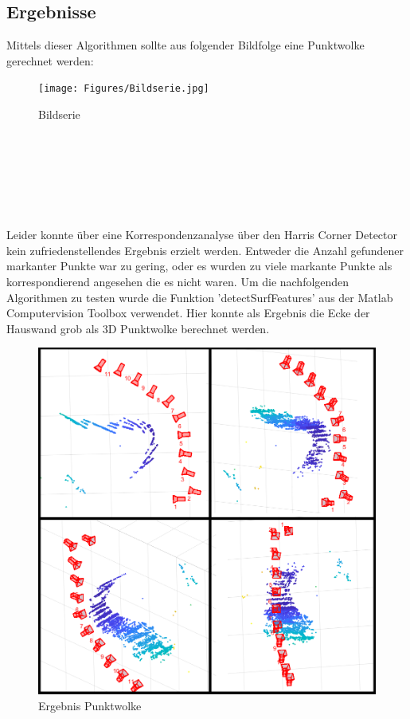 \subsection{Ergebnisse}
Mittels dieser Algorithmen sollte aus folgender Bildfolge eine Punktwolke gerechnet werden:
\begin{figure}[ht]
    \centering
    \texttt{[image: Figures/Bildserie.jpg]}
    \caption{Bildserie}
\end{figure}
\\
\\
\\
\\
\\
\\
Leider konnte über eine Korrespondenzanalyse über den Harris Corner Detector kein zufriedenstellendes Ergebnis erzielt werden. Entweder die Anzahl gefundener markanter Punkte war zu gering, oder es wurden zu viele markante Punkte als korrespondierend angesehen die es nicht waren. Um die nachfolgenden Algorithmen zu testen wurde die Funktion 'detectSurfFeatures' aus der Matlab Computervision Toolbox verwendet. Hier konnte als Ergebnis die Ecke der Hauswand grob als 3D Punktwolke berechnet werden.

\begin{figure}[ht]
    \centering
    \includegraphics[scale=0.4]{Figures/ErgebnisZusammen.png}
    \caption{Ergebnis Punktwolke}
\end{figure}

\clearpage

